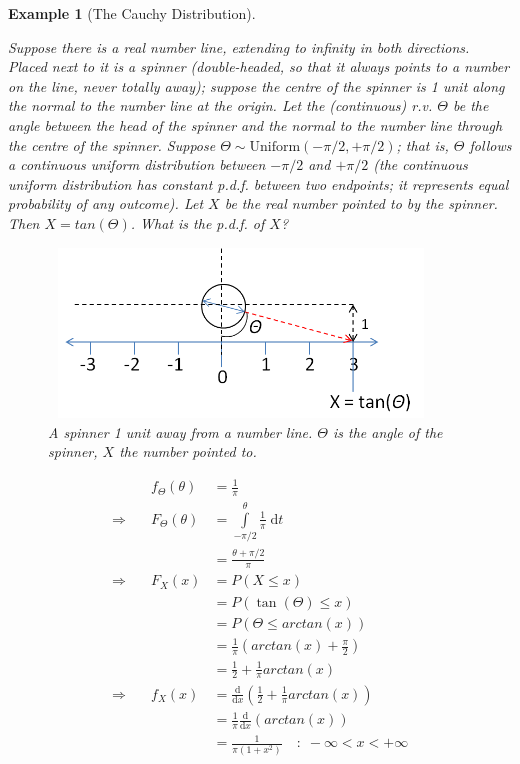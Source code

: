\documentclass[12pt,a4paper]{article}
\newtheorem{ex}[thm]{Example}
\begin{document}
\begin{ex}[The Cauchy Distribution]\label{Cauchy}$\;$\par
\vspace{1cm}

Suppose there is a real number line, extending to infinity in both directions. Placed next to it is a spinner (double-headed, so that it always points to a number on the line, never totally away); suppose the centre of the spinner is 1 unit along the normal to the number line at the origin. Let the (continuous) r.v. $\Theta$ be the angle between the head of the spinner and the normal to the number line through the centre of the spinner. Suppose $\Theta \sim \text{Uniform}(-\pi/2, +\pi/2)$; that is, $\Theta$ follows a continuous uniform distribution between $-\pi/2$ and $+\pi/2$ (the continuous uniform distribution has constant p.d.f. between two endpoints; it represents equal probability of any outcome). Let $X$ be the real number pointed to by the spinner. Then $X = tan(\Theta)$. What is the p.d.f. of $X$?

\begin{figure}[h]
\begin{center}
\includegraphics[height=45.1mm,width=102mm]{M2S1 Cauchy Figure.png}
\caption{A spinner 1 unit away from a number line. $\Theta$ is the angle of the spinner, $X$ the number pointed to.}
\end{center}
\end{figure}

\begingroup
\renewcommand*{\arraystretch}{1.5}
$$\begin{array}{rll}
&f_\Theta (\theta) &= \frac{1}{\pi}\\
\Rightarrow \quad &F_\Theta (\theta) &= \int\limits_{-\pi/2}^{\theta}\!\! \frac{1}{\pi} \;\mathrm{d}t\\
& &=\frac{\theta + \pi/2}{\pi}\\
\Rightarrow \quad &F_X(x) &= P(X \leq x)\\
& &= P\left(\tan(\Theta) \leq x \right)\\
& &= P\left(\Theta \leq arctan(x)\right)\\
& &= \frac{1}{\pi}\left(arctan (x) + \frac{\pi}{2}\right)\\
& &= \frac{1}{2} + \frac{1}{\pi} arctan(x)\\
\Rightarrow \quad &f_X(x) &= \frac{\mathrm{d}}{\mathrm{d}x}\left(\frac{1}{2} + \frac{1}{\pi} arctan(x)\right)\\
& &= \frac{1}{\pi} \frac{\mathrm{d}}{\mathrm{d}x}\left( arctan(x)\right)\\
& &= \frac{1}{\pi (1 + x^2)} \quad : \; -\infty < x < +\infty
\end{array}$$

\endgroup
\end{ex}
\end{document}
